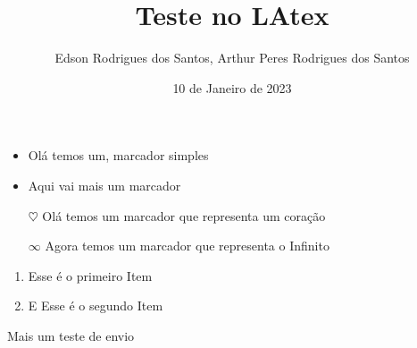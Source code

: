 \documentclass[12pt,a4paper,brazil,oneside]{book}
\title{Teste no LAtex}
\author{Edson Rodrigues dos Santos, Arthur Peres Rodrigues dos Santos}
\date{10 de Janeiro de 2023}
\begin{document}
\maketitle\newpage

\begin{itemize}
 \item Olá temos um, marcador 
 simples
 \item Aqui vai mais um marcador
 
\end{itemize}

\begin{itemize}
	\item[$\heartsuit$] Olá temos um marcador que representa um coração 
	\item[$\infty$] Agora temos um marcador que representa o Infinito
\end{itemize}

\begin{enumerate}
	\item Esse é o {primeiro} Item
	\item E Esse é o {segundo} Item
\end{enumerate}

Mais um teste de envio 
\end{document}
